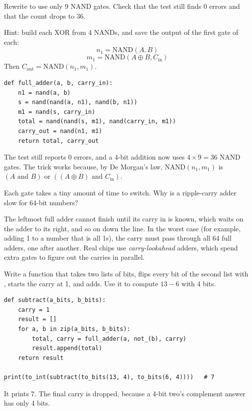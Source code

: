 \begin{Exercise}[title={The Clever Full Adder}, label=dl_nine]
Rewrite  to use only 9 NAND gates. Check that the test still finds 0 errors
and that the count drops to 36.

Hint: build each XOR from 4 NANDs, and save the output of the first gate of each:
$$n_1 = \text{NAND}(A, B)$$
$$m_1 = \text{NAND}(A \oplus B, C_{\text{in}})$$
Then $C_{\text{out}} = \text{NAND}(n_1, m_1)$.
\end{Exercise}
\begin{Answer}[ref=dl_nine]
\begin{verbatim}
def full_adder(a, b, carry_in):
    n1 = nand(a, b)
    s = nand(nand(a, n1), nand(b, n1))
    m1 = nand(s, carry_in)
    total = nand(nand(s, m1), nand(carry_in, m1))
    carry_out = nand(n1, m1)
    return total, carry_out
\end{verbatim}
The test still reports 0 errors, and a 4-bit addition now uses $4 \times 9 = 36$ NAND gates. The trick
works because, by De Morgan's law, NAND$(n_1, m_1)$ is $(A \text{ and } B)$ or $((A \oplus B) \text{ and }
C_{\text{in}})$.
\end{Answer}

\begin{Exercise}[title={Waiting for the Carry}, label=dl_ripple]
Each gate takes a tiny amount of time to switch. Why is a ripple-carry adder slow for 64-bit numbers?
\end{Exercise}
\begin{Answer}[ref=dl_ripple]
The leftmost full adder cannot finish until its carry in is known, which waits on the adder to its right,
and so on down the line. In the worst case (for example, adding 1 to a number that is all 1s), the carry
must pass through all 64 full adders, one after another. Real chips use \emph{carry-lookahead} adders, which
spend extra gates to figure out the carries in parallel.
\end{Answer}

\begin{Exercise}[title={Subtract with an Adder}, label=dl_sub]
Write a function  that takes two lists of bits, flips every bit of the second
list with , starts the carry at 1, and adds. Use it to compute $13 - 6$ with
4 bits.
\end{Exercise}
\begin{Answer}[ref=dl_sub]
\begin{verbatim}
def subtract(a_bits, b_bits):
    carry = 1
    result = []
    for a, b in zip(a_bits, b_bits):
        total, carry = full_adder(a, not_(b), carry)
        result.append(total)
    return result

print(to_int(subtract(to_bits(13, 4), to_bits(6, 4))))   # 7
\end{verbatim}
It prints 7. The final carry is dropped, because a 4-bit two's complement answer has only 4 bits.
\end{Answer}
